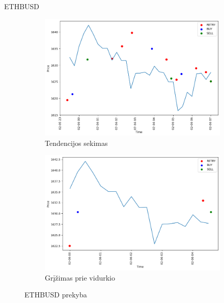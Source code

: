 \documentclass{VUMIFInfKursinis}
\begin{document}
ETHBUSD
\begin{figure}[H]
  \centering
  \begin{subfigure}{.5\textwidth}
    \centering
    \includegraphics[width=\linewidth]{img/ETHBUSD_ARIMA_trades.png}
    \caption{Tendencijos sekimas}
    \label{fig:ethbusd_arima_trades}
  \end{subfigure}%
  \begin{subfigure}{.5\textwidth}
    \centering
    \includegraphics[width=\linewidth]{img/ETHBUSD_SMA_trades.png}
    \caption{Grįžimas prie vidurkio}
    \label{fig:ethbusd_sma_trades}
  \end{subfigure}
  \caption{ETHBUSD prekyba}
  \label{fig:ethbusd_trades}
\end{figure}
\end{document}
